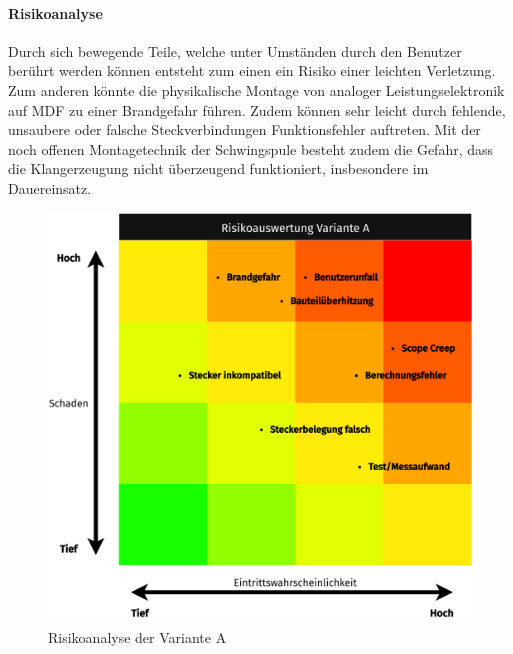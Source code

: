 \paragraph{Risikoanalyse}
Durch sich bewegende Teile, welche unter Umständen durch den Benutzer berührt werden können entsteht zum einen ein Risiko einer leichten Verletzung. Zum anderen könnte die physikalische Montage von analoger Leistungselektronik auf MDF zu einer Brandgefahr führen. Zudem können sehr leicht durch fehlende, unsaubere oder falsche Steckverbindungen Funktionsfehler auftreten. Mit der noch offenen Montagetechnik der Schwingspule besteht zudem die Gefahr, dass die Klangerzeugung nicht überzeugend funktioniert, insbesondere im Dauereinsatz.
\begin{figure}[H]
	\centering
	\includegraphics[width=\textwidth*4/5]{pictures/risks-Variante A_ Alles analog.png}
	\caption{Risikoanalyse der Variante A}
\end{figure}
\newpage
